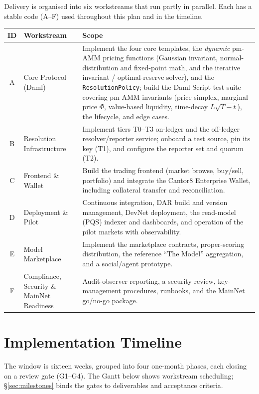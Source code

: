 \documentclass[11pt,a4paper]{article}
\begin{document}
Delivery is organised into six workstreams that run partly in parallel. Each has a stable code (A--F) used throughout this plan and in the timeline.

\begin{center}
\renewcommand{\arraystretch}{1.2}
\begin{tabularx}{\linewidth}{c R{3.5cm} Y}
\toprule
\textbf{ID} & \textbf{Workstream} & \textbf{Scope} \\
\midrule
A & Core Protocol (Daml) & Implement the four core templates, the \emph{dynamic} pm-AMM pricing functions (Gaussian invariant, normal-distribution and fixed-point math, and the iterative invariant / optimal-reserve solver), and the \texttt{ResolutionPolicy}; build the Daml Script test suite covering pm-AMM invariants (price simplex, marginal price $\Phi$, value-based liquidity, time-decay $L\sqrt{T-t}$), the lifecycle, and edge cases. \\
B & Resolution Infrastructure & Implement tiers T0--T3 on-ledger and the off-ledger resolver/reporter service; onboard a test source, pin its key (T1), and configure the reporter set and quorum (T2). \\
C & Frontend \& Wallet & Build the trading frontend (market browse, buy/sell, portfolio) and integrate the Cantor8 Enterprise Wallet, including collateral transfer and reconciliation. \\
D & Deployment \& Pilot & Continuous integration, DAR build and version management, DevNet deployment, the read-model (PQS) indexer and dashboards, and operation of the pilot markets with observability. \\
E & Model Marketplace & Implement the marketplace contracts, proper-scoring distribution, the reference ``The Model'' aggregation, and a social/agent prototype. \\
F & Compliance, Security \& MainNet Readiness & Audit-observer reporting, a security review, key-management procedures, runbooks, and the MainNet go/no-go package. \\
\bottomrule
\end{tabularx}
\end{center}

\section{Implementation Timeline}

The window is sixteen weeks, grouped into four one-month phases, each closing on a review gate (G1--G4). The Gantt below shows workstream scheduling; \S\ref{sec:milestones} binds the gates to deliverables and acceptance criteria.
\end{document}
